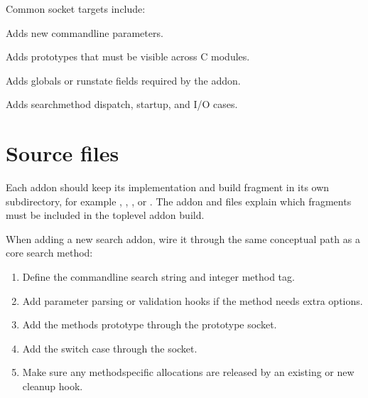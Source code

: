 \documentclass[letterpaper,10pt,english]{sphinxmanual}
\begin{document}
\sphinxAtStartPar
Common socket targets include:
\begin{description}
\sphinxAtStartPar
Adds new command\sphinxhyphen{}line parameters.

\sphinxAtStartPar
Adds prototypes that must be visible across C modules.

\sphinxAtStartPar
Adds globals or run\sphinxhyphen{}state fields required by the add\sphinxhyphen{}on.

\sphinxAtStartPar
Adds search\sphinxhyphen{}method dispatch, startup, and I/O cases.

\end{description}


\section{Source files}
\label{\detokenize{addons:source-files}}
\sphinxAtStartPar
Each add\sphinxhyphen{}on should keep its implementation and build fragment in its own
subdirectory, for example , ,
, or . The add\sphinxhyphen{}on
 and  files explain which fragments
must be included in the top\sphinxhyphen{}level add\sphinxhyphen{}on build.

\sphinxAtStartPar
When adding a new search add\sphinxhyphen{}on, wire it through the same conceptual path as a
core search method:
\begin{enumerate}
%
\item {} 
\sphinxAtStartPar
Define the command\sphinxhyphen{}line search string and integer method tag.

\item {} 
\sphinxAtStartPar
Add parameter parsing or validation hooks if the method needs extra options.

\item {} 
\sphinxAtStartPar
Add the method\textquotesingle{}s prototype through the prototype socket.

\item {} 
\sphinxAtStartPar
Add the  switch case through the  socket.

\item {} 
\sphinxAtStartPar
Make sure any method\sphinxhyphen{}specific allocations are released by an existing or new
cleanup hook.

\end{enumerate}
\end{document}
